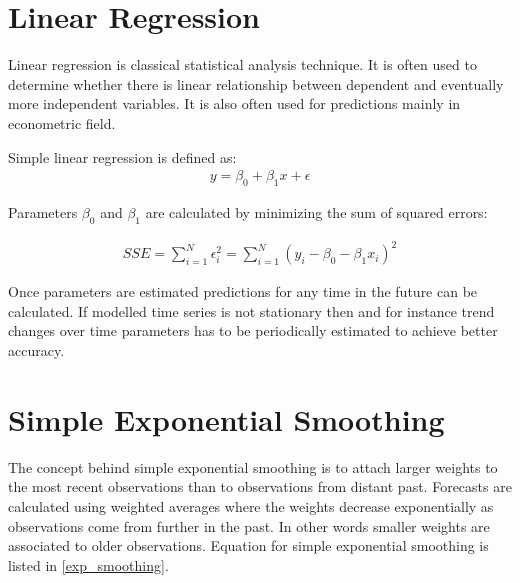     \section{Linear Regression}
    Linear regression is classical statistical analysis technique. It is often used to
    determine whether there is linear relationship between dependent and eventually more
    independent variables. It is also often used for predictions mainly in econometric
    field. 

    Simple linear regression is defined as:
    \begin{eqnarray}
        y = \beta_0 + \beta_1 x + \epsilon
    \end{eqnarray}

    Parameters $\beta_0$ and $\beta_1$ are calculated by minimizing the sum of squared
    errors:
    
    \begin{eqnarray}
        SSE = \sum_{i=1}^N \epsilon_{i}^2 = \sum_{i=1}^N (y_i - \beta_0 - \beta_1 x_i)^2
    \end{eqnarray}
    
    Once parameters are estimated predictions for any time in the future can be calculated. 
    If modelled time series is not stationary then and for instance trend changes over
    time parameters has to be periodically estimated to achieve better accuracy. 

    \section{Simple Exponential Smoothing}
    The concept behind simple exponential smoothing is to attach 
    larger weights to the most recent observations than to observations from distant
    past. Forecasts are calculated using weighted averages where the weights 
    decrease exponentially as observations come from further in the past.
    In other words smaller weights are associated to older observations.
    Equation for simple exponential smoothing is listed in \ref{exp_smoothing}.

